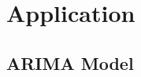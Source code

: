 \documentclass[12pt, centerh1]{article}
\begin{document}
\section{Application}

\subsection{ARIMA Model}
\end{document}
